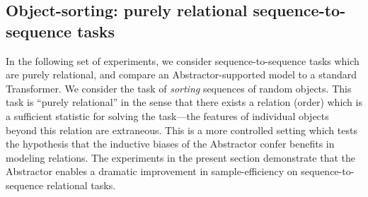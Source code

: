 \subsection{Object-sorting: purely relational sequence-to-sequence tasks}\label{ssec:experiments_object_sorting}

In the following set of experiments, we consider sequence-to-sequence tasks which are purely relational, and compare an Abstractor-supported model to a standard Transformer. We consider the task of \textit{sorting} sequences of random objects. This task is ``purely relational'' in the sense that there exists a relation (order) which is a sufficient statistic for solving the task---the features of individual objects beyond this relation are extraneous. This is a more controlled setting which tests the hypothesis that the inductive biases of the Abstractor confer benefits in modeling relations. The experiments in the present section demonstrate that the Abstractor enables a dramatic improvement in sample-efficiency on sequence-to-sequence relational tasks.
